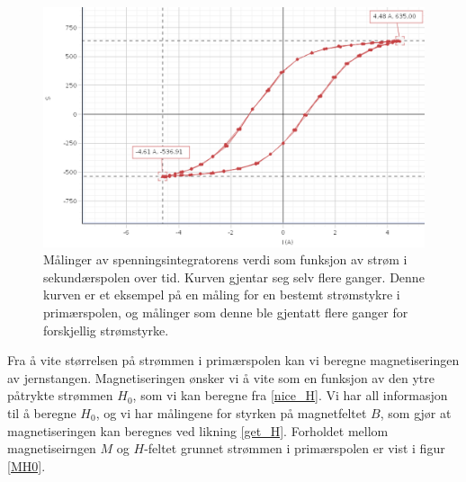 \documentclass[%
 reprint,
nofootinbib,
aps,
]{revtex4-1}
\begin{document}
\begin{figure}[h!]
  \centering
  \includegraphics[scale=0.255]{Hysterese.png}
  \caption{Målinger av spenningsintegratorens verdi som funksjon av strøm i sekundærspolen over tid. Kurven gjentar seg selv flere ganger. Denne kurven er et eksempel på en måling for en bestemt strømstykre i primærspolen, og målinger som denne ble gjentatt flere ganger for forskjellig strømstyrke.}
  \label{hysterese123}
\end{figure}
Fra å vite størrelsen på strømmen i primærspolen kan vi beregne magnetiseringen av jernstangen. Magnetiseringen ønsker vi å vite som en funksjon av den ytre påtrykte strømmen $H_0$, som vi kan beregne fra \eqref{nice_H}. Vi har all informasjon til å beregne $H_0$, og vi har målingene for styrken på magnetfeltet $B$, som gjør at magnetiseringen kan beregnes ved likning \eqref{get_H}. Forholdet mellom magnetiseirngen $M$ og $H$-feltet grunnet strømmen i primærspolen er vist i figur \vref{MH0}.
\end{document}
